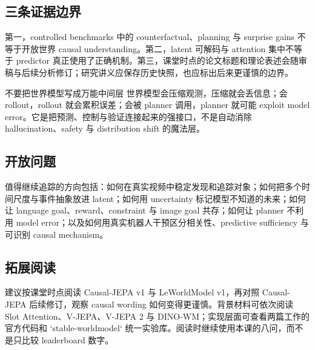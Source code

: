 \subsection{三条证据边界}

第一，controlled benchmarks 中的 counterfactual、planning 与 surprise gains 不等于开放世界 causal understanding。第二，latent 可解码与 attention 集中不等于 predictor 真正使用了正确机制。第三，课堂时点的论文标题和理论表述会随审稿与后续分析修订；研究讲义应保存历史快照，也应标出后来更谨慎的边界。

\begin{warningbox}{不要把世界模型写成万能中间层}
世界模型会压缩观测，压缩就会丢信息；会 rollout，rollout 就会累积误差；会被 planner 调用，planner 就可能 exploit model error。它是把预测、控制与验证连接起来的强接口，不是自动消除 hallucination、safety 与 distribution shift 的魔法层。
\end{warningbox}

\subsection{开放问题}

值得继续追踪的方向包括：如何在真实视频中稳定发现和追踪对象；如何把多个时间尺度与事件抽象放进 latent；如何用 uncertainty 标记模型不知道的未来；如何让 language goal、reward、constraint 与 image goal 共存；如何让 planner 不利用 model error；以及如何用真实机器人干预区分相关性、predictive sufficiency 与可识别 causal mechanism。

\subsection{拓展阅读}

建议按课堂时点阅读 Causal-JEPA v1 与 LeWorldModel v1，再对照 Causal-JEPA 后续修订，观察 causal wording 如何变得更谨慎。背景材料可依次阅读 Slot Attention、V-JEPA、V-JEPA 2 与 DINO-WM；实现层面可查看两篇工作的官方代码和 `stable-worldmodel` 统一实验库。阅读时继续使用本课的八问，而不是只比较 leaderboard 数字。



